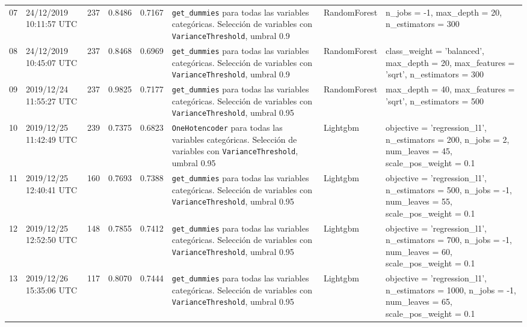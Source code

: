 \documentclass[a4paper, 20pt]{article}
\begin{document}
\begin{longtable}{lL{2cm}lllL{3cm}L{2.5cm}L{3.5cm}}
07 & 24/12/2019 10:11:57 UTC & 237 & 0.8486 & 0.7167 & \texttt{get\_dummies} para todas las variables categóricas. Selección de variables con \texttt{VarianceThreshold}, umbral 0.9 & RandomForest & {\ttfamily n\_jobs = -1, max\_depth = 20, n\_estimators = 300}\\

08 & 24/12/2019 10:45:07 UTC & 237 & 0.8468 & 0.6969 & \texttt{get\_dummies} para todas las variables categóricas. Selección de variables con \texttt{VarianceThreshold}, umbral 0.9 & RandomForest & {\ttfamily class\_weight = 'balanced', max\_depth = 20, max\_features = 'sqrt', n\_estimators = 300}\\

09 & 2019/12/24 11:55:27 UTC & 237 & 0.9825 & 0.7177 & \texttt{get\_dummies} para todas las variables categóricas. Selección de variables con \texttt{VarianceThreshold}, umbral 0.95 & RandomForest & {\ttfamily max\_depth = 40, max\_features = 'sqrt', n\_estimators = 500}\\

10 & 2019/12/25 11:42:49 UTC & 239 & 0.7375 & 0.6823 & \texttt{OneHotencoder} para todas las variables categóricas. Selección de variables con \texttt{VarianceThreshold}, umbral 0.95 & Lightgbm & {\ttfamily objective = 'regression\_l1', n\_estimators = 200, n\_jobs = 2, num\_leaves = 45, scale\_pos\_weight = 0.1}\\

11 & 2019/12/25 12:40:41 UTC & 160 & 0.7693 & 0.7388 & \texttt{get\_dummies} para todas las variables categóricas. Selección de variables con \texttt{VarianceThreshold}, umbral 0.95 & Lightgbm & {\ttfamily objective = 'regression\_l1', n\_estimators = 500, n\_jobs = -1, num\_leaves = 55, scale\_pos\_weight = 0.1}\\

12 & 2019/12/25 12:52:50 UTC & 148 & 0.7855 & 0.7412 & \texttt{get\_dummies} para todas las variables categóricas. Selección de variables con \texttt{VarianceThreshold}, umbral 0.95 & Lightgbm & {\ttfamily objective = 'regression\_l1', n\_estimators = 700, n\_jobs = -1, num\_leaves = 60, scale\_pos\_weight = 0.1}\\

13 & 2019/12/26 15:35:06 UTC & 117 & 0.8070 & 0.7444 & \texttt{get\_dummies} para todas las variables categóricas. Selección de variables con \texttt{VarianceThreshold}, umbral 0.95 & Lightgbm & {\ttfamily objective = 'regression\_l1', n\_estimators = 1000, n\_jobs = -1, num\_leaves = 65, scale\_pos\_weight = 0.1}\\


\end{longtable}
\end{document}
